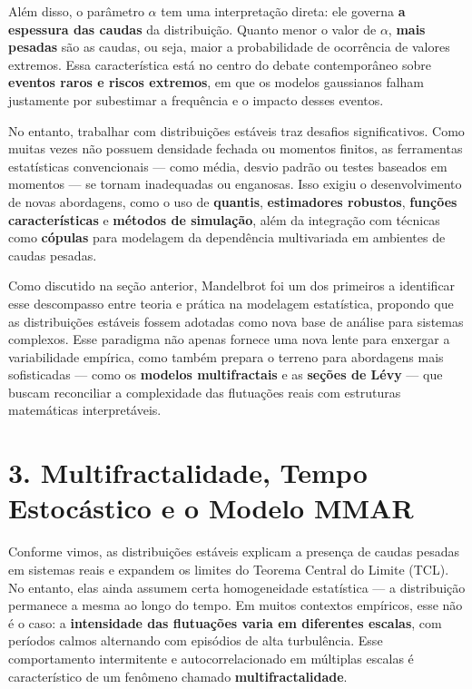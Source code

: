 \documentclass[
]{agujournal2019}
\begin{document}
Além disso, o parâmetro \(\alpha\) tem uma interpretação direta: ele
governa \textbf{a espessura das caudas} da distribuição. Quanto menor o
valor de \(\alpha\), \textbf{mais pesadas} são as caudas, ou seja, maior
a probabilidade de ocorrência de valores extremos. Essa característica
está no centro do debate contemporâneo sobre \textbf{eventos raros e
riscos extremos}, em que os modelos gaussianos falham justamente por
subestimar a frequência e o impacto desses eventos.

No entanto, trabalhar com distribuições estáveis traz desafios
significativos. Como muitas vezes não possuem densidade fechada ou
momentos finitos, as ferramentas estatísticas convencionais --- como
média, desvio padrão ou testes baseados em momentos --- se tornam
inadequadas ou enganosas. Isso exigiu o desenvolvimento de novas
abordagens, como o uso de \textbf{quantis}, \textbf{estimadores
robustos}, \textbf{funções características} e \textbf{métodos de
simulação}, além da integração com técnicas como \textbf{cópulas} para
modelagem da dependência multivariada em ambientes de caudas pesadas.

Como discutido na seção anterior, Mandelbrot foi um dos primeiros a
identificar esse descompasso entre teoria e prática na modelagem
estatística, propondo que as distribuições estáveis fossem adotadas como
nova base de análise para sistemas complexos. Esse paradigma não apenas
fornece uma nova lente para enxergar a variabilidade empírica, como
também prepara o terreno para abordagens mais sofisticadas --- como os
\textbf{modelos multifractais} e as \textbf{seções de Lévy} --- que
buscam reconciliar a complexidade das flutuações reais com estruturas
matemáticas interpretáveis.

\section{3. Multifractalidade, Tempo Estocástico e o Modelo
MMAR}\label{multifractalidade-tempo-estocuxe1stico-e-o-modelo-mmar}

Conforme vimos, as distribuições estáveis explicam a presença de caudas
pesadas em sistemas reais e expandem os limites do Teorema Central do
Limite (TCL). No entanto, elas ainda assumem certa homogeneidade
estatística --- a distribuição permanece a mesma ao longo do tempo. Em
muitos contextos empíricos, esse não é o caso: a \textbf{intensidade das
flutuações varia em diferentes escalas}, com períodos calmos alternando
com episódios de alta turbulência. Esse comportamento intermitente e
autocorrelacionado em múltiplas escalas é característico de um fenômeno
chamado \textbf{multifractalidade}.
\end{document}
